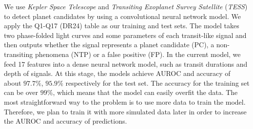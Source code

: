 \begin{titlepage}
\noindent We use \textit{Kepler Space Telescope} and
\textit{Transiting Exoplanet Survey Satellite} (\textit{TESS})
to detect planet candidates by using a convolutional neural
network model. We apply the Q1-Q17 (DR24) table as our training
and test sets. The model takes
two phase-folded light curves and some parameters of each transit-like signal
and then outputs whether the signal represents a planet candidate (PC), 
a non-transiting phenomena (NTP) or a false positive (FP).
In the current model, we feed 17 features into a dense neural network
model, such as transit durations and depth of signals.
At this stage, the models achieve AUROC and accuracy
of about $97.7\%$, $95.9\%$ respectively for the test set.
The accuracy for the training set can be over $99\%$, which means that
the model can easily overfit the data. The most straightforward way to the
problem is to use more data to train the model.
Therefore, we plan to train it with more simulated data later in order to
increase the AUROC and accuracy of predictions.
    
\end{titlepage}